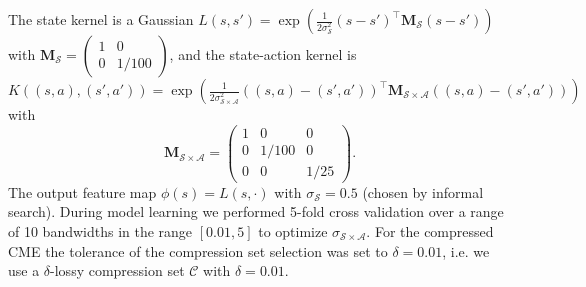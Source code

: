 \documentclass[letterpaper]{article}
\newcommand{\cC}{{\mathcal C}}
\newcommand{\cA}{{\mathcal A}}
\newcommand{\cS}{{\mathcal S}}
\newcommand{\bM}{{\bm M}}
\begin{document}
The state kernel is a Gaussian $L(s,s') = \exp\left({\frac{1}{2\sigma_{\cS}^2}(s - s')^\top \bM_\cS (s - s')}\right)$ with $\bM_\cS =\left( \begin{array}{cc}
1 & 0 \\
0 & 1/100  \end{array} \right)$, and the state-action kernel is  $K((s,a),(s',a')) = \exp\left({\frac{1}{2\sigma_{\cS\times\cA}^2}((s,a) - (s',a'))^\top \bM_{\cS\times\cA} ((s,a) - (s',a'))}\right)$ with
$$\bM_{\cS\times\cA} =\left( \begin{array}{ccc}
1 & 0 & 0\\
0 & 1/100 & 0\\
0 & 0 & 1/25\end{array} \right).$$ The output feature map $\phi(s) = L(s,\cdot)$ with $\sigma_{\cS} = 0.5$ (chosen by informal search). During model learning we performed 5-fold cross validation over a range of 10 bandwidths in the range $[0.01,5]$ to optimize $\sigma_{\cS\times\cA}$. For the compressed CME the tolerance of the compression set selection was set to $\delta = 0.01$, i.e. we use a $\delta$-lossy compression set $\cC$ with $\delta=0.01$.
\end{document}

